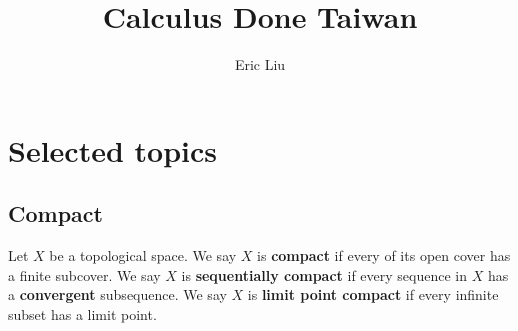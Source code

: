 \documentclass{report}
\title{Calculus Done Taiwan}
\author{Eric Liu}
\date{}
\begin{document}
\maketitle
\newpage%

\tableofcontents
\pagebreak
\chapter{Selected topics}
\section{Compact}
Let $X$ be a topological space. We say $X$ is \textbf{compact} if every of its open cover has a finite subcover. We say $X$ is \textbf{sequentially compact} if every sequence in $X$ has a \textbf{convergent} subsequence. We say $X$ is \textbf{limit point compact} if every infinite subset has a limit point.\\
\end{document}
